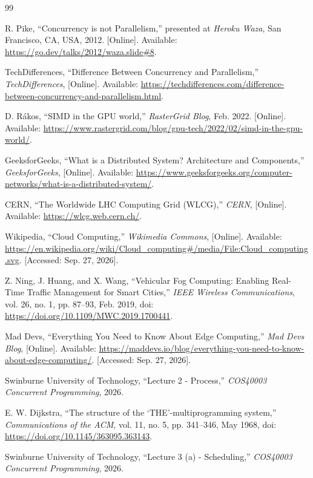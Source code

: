 \documentclass[11pt,a4paper]{article}
\begin{document}
\begin{thebibliography}{99}
\raggedright

R. Pike, ``Concurrency is not Parallelism,'' presented at \emph{Heroku Waza}, San Francisco, CA, USA, 2012. [Online]. Available: \url{https://go.dev/talks/2012/waza.slide#8}. 

TechDifferences, ``Difference Between Concurrency and Parallelism,'' \emph{TechDifferences}, [Online]. Available: \url{https://techdifferences.com/difference-between-concurrency-and-parallelism.html}. 

D. Rákos, ``SIMD in the GPU world,'' \emph{RasterGrid Blog}, Feb. 2022. [Online]. Available: \url{https://www.rastergrid.com/blog/gpu-tech/2022/02/simd-in-the-gpu-world/}. 

GeeksforGeeks, ``What is a Distributed System? Architecture and Components,'' \emph{GeeksforGeeks}, [Online]. Available: \url{https://www.geeksforgeeks.org/computer-networks/what-is-a-distributed-system/}. 

CERN, ``The Worldwide LHC Computing Grid (WLCG),'' \emph{CERN}, [Online]. Available: \url{https://wlcg.web.cern.ch/}. 

Wikipedia, ``Cloud Computing,'' \emph{Wikimedia Commons}, [Online]. Available: \url{https://en.wikipedia.org/wiki/Cloud_computing#/media/File:Cloud_computing.svg}. [Accessed: Sep. 27, 2026].

Z. Ning, J. Huang, and X. Wang, ``Vehicular Fog Computing: Enabling Real-Time Traffic Management for Smart Cities,'' \emph{IEEE Wireless Communications}, vol. 26, no. 1, pp. 87--93, Feb. 2019, doi: \url{https://doi.org/10.1109/MWC.2019.1700441}.

Mad Devs, ``Everything You Need to Know About Edge Computing,'' \emph{Mad Devs Blog}, [Online]. Available: \url{https://maddevs.io/blog/everything-you-need-to-know-about-edge-computing/}. [Accessed: Sep. 27, 2026].

Swinburne University of Technology, ``Lecture 2 - Process,'' \emph{COS40003 Concurrent Programming}, 2026.

E. W. Dijkstra, ``The structure of the `THE'-multiprogramming system,'' \emph{Communications of the ACM}, vol. 11, no. 5, pp. 341--346, May 1968, doi: \url{https://doi.org/10.1145/363095.363143}.

Swinburne University of Technology, ``Lecture 3 (a) - Scheduling,'' \emph{COS40003 Concurrent Programming}, 2026.

\end{thebibliography}
\end{document}
